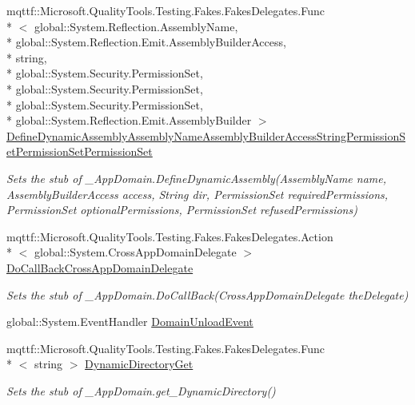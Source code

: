\begin{DoxyCompactItemize}
mqttf\-::\-Microsoft.\-Quality\-Tools.\-Testing.\-Fakes.\-Fakes\-Delegates.\-Func\\*
$<$ global\-::\-System.\-Reflection.\-Assembly\-Name, \\*
global\-::\-System.\-Reflection.\-Emit.\-Assembly\-Builder\-Access, \\*
string, \\*
global\-::\-System.\-Security.\-Permission\-Set, \\*
global\-::\-System.\-Security.\-Permission\-Set, \\*
global\-::\-System.\-Security.\-Permission\-Set, \\*
global\-::\-System.\-Reflection.\-Emit.\-Assembly\-Builder $>$ \hyperlink{class_system_1_1_fakes_1_1_stub___app_domain_a2a57401d2cd459de6d48cda72f94b6fc}{Define\-Dynamic\-Assembly\-Assembly\-Name\-Assembly\-Builder\-Access\-String\-Permission\-Set\-Permission\-Set\-Permission\-Set}
\begin{DoxyCompactList}\small\item\em Sets the stub of \-\_\-\-App\-Domain.\-Define\-Dynamic\-Assembly(\-Assembly\-Name name, Assembly\-Builder\-Access access, String dir, Permission\-Set required\-Permissions, Permission\-Set optional\-Permissions, Permission\-Set refused\-Permissions)\end{DoxyCompactList}\item 
mqttf\-::\-Microsoft.\-Quality\-Tools.\-Testing.\-Fakes.\-Fakes\-Delegates.\-Action\\*
$<$ global\-::\-System.\-Cross\-App\-Domain\-Delegate $>$ \hyperlink{class_system_1_1_fakes_1_1_stub___app_domain_a8432ac505abb2770b673e607cf871468}{Do\-Call\-Back\-Cross\-App\-Domain\-Delegate}
\begin{DoxyCompactList}\small\item\em Sets the stub of \-\_\-\-App\-Domain.\-Do\-Call\-Back(\-Cross\-App\-Domain\-Delegate the\-Delegate)\end{DoxyCompactList}\item 
global\-::\-System.\-Event\-Handler \hyperlink{class_system_1_1_fakes_1_1_stub___app_domain_af817a7f9d7c23073f7915a2e8bce2a85}{Domain\-Unload\-Event}
\item 
mqttf\-::\-Microsoft.\-Quality\-Tools.\-Testing.\-Fakes.\-Fakes\-Delegates.\-Func\\*
$<$ string $>$ \hyperlink{class_system_1_1_fakes_1_1_stub___app_domain_aa173b744639579ccbb39315d2b1aff62}{Dynamic\-Directory\-Get}
\begin{DoxyCompactList}\small\item\em Sets the stub of \-\_\-\-App\-Domain.\-get\-\_\-\-Dynamic\-Directory()\end{DoxyCompactList}\item 

\end{DoxyCompactItemize}
